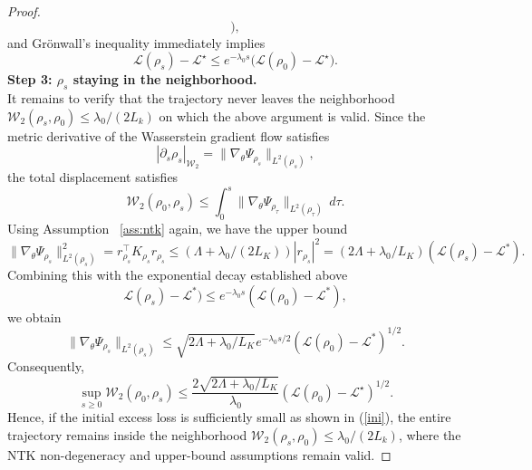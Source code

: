\documentclass[10pt,a4paper]{amsart}
\newcommand{\Wass}{\mathcal{W}}
\begin{document}
\begin{proof}
\[\bigr),
\]
and Gr\"onwall's inequality immediately implies
\[
\mathcal L(\rho_s)-\mathcal L^\star
\le
e^{-\lambda_0 s}
\bigl(
\mathcal L(\rho_0)-\mathcal L^\star
\bigr).
\]
{\bf Step 3: $\rho_s$ staying in the neighborhood.}\\
It remains to verify that the trajectory never leaves the neighborhood
$\Wass_2(\rho_s,\rho_0)\le \lambda_0/(2L_k)$ on which the above argument is valid.
Since the metric derivative of the Wasserstein gradient flow satisfies
\[
|\partial_s  \rho_s|_{\Wass_2}
=
\|
\nabla_\theta\Psi_{\rho_s}
\|_{L^2(\rho_s)},
\]
the total displacement satisfies
\[
\Wass_2(\rho_0,\rho_s)
\le
\int_0^s
\|
\nabla_\theta\Psi_{\rho_\tau}
\|_{L^2(\rho_\tau)}
\,d\tau.
\]
Using Assumption ~\ref{ass:ntk} again,  we have the upper bound 
$$
\|\nabla_\theta \Psi_{\rho_s}\|^2_{L^2(\rho_s)}= r_{\rho_s}^\top K_{\rho_s} r_{\rho_s} \leq (\Lambda +\lambda_0/(2L_K))  |r_{\rho_s}|^2 
=(2 \Lambda+\lambda_0/L_K) ( \mathcal L(\rho_s)-\mathcal L^*).
$$
Combining this with the exponential decay established above 
$$
 \mathcal L(\rho_s)-\mathcal L^*)  \leq  e^{-\lambda_0 s} ( \mathcal L(\rho_0)-\mathcal L^*),
$$
we obtain %
$$
\|\nabla_\theta \Psi_{\rho_s}\|_{L^2(\rho_s)}
\leq \sqrt{2\Lambda +\lambda_0/L_K} e^{-\lambda_0 s/2} ( \mathcal L(\rho_0)-\mathcal L^*)^{1/2}. 
$$
Consequently,  
\[
\sup_{s\ge0}
\Wass_2(\rho_0,\rho_s)
\le
\frac{2\sqrt{2\Lambda +\lambda_0/L_K} }{\lambda_0}
(\mathcal L(\rho_0)-\mathcal L^\star)^{1/2}.
\]
Hence, if the initial excess loss is sufficiently small as shown in (\ref{ini}),  the entire trajectory remains inside the neighborhood $\Wass_2(\rho_s,\rho_0)\le \lambda_0/(2L_k)$, 
where  the NTK non-degeneracy and upper-bound assumptions remain valid.
\end{proof}
\end{document}
